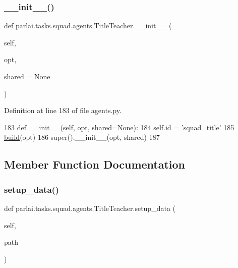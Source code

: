 \subsubsection{\texorpdfstring{\+\_\+\+\_\+init\+\_\+\+\_\+()}{\_\_init\_\_()}}
{\footnotesize\ttfamily def parlai.\+tasks.\+squad.\+agents.\+Title\+Teacher.\+\_\+\+\_\+init\+\_\+\+\_\+ (\begin{DoxyParamCaption}\item[{}]{self,  }\item[{}]{opt,  }\item[{}]{shared = {\ttfamily None} }\end{DoxyParamCaption})}



Definition at line 183 of file agents.\+py.


\begin{DoxyCode}
183     \textcolor{keyword}{def }\_\_init\_\_(self, opt, shared=None):
184         self.id = \textcolor{stringliteral}{'squad\_title'}
185         \hyperlink{namespaceparlai_1_1mturk_1_1tasks_1_1talkthewalk_1_1download_a8c0fbb9b6dfe127cb8c1bd6e7c4e33fd}{build}(opt)
186         super().\_\_init\_\_(opt, shared)
187 
\end{DoxyCode}


\subsection{Member Function Documentation}
\mbox{\label{classparlai_1_1tasks_1_1squad_1_1agents_1_1TitleTeacher_af60b7813cbea1681237c9290a64489ef}} 
\subsubsection{\texorpdfstring{setup\+\_\+data()}{setup\_data()}}
{\footnotesize\ttfamily def parlai.\+tasks.\+squad.\+agents.\+Title\+Teacher.\+setup\+\_\+data (\begin{DoxyParamCaption}\item[{}]{self,  }\item[{}]{path }\end{DoxyParamCaption})}



